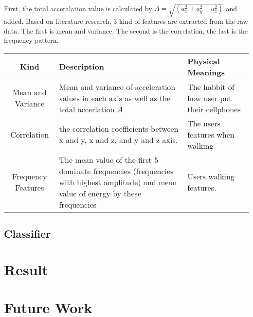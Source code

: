 \documentclass{article}
\begin{document}
		\paragraph{}First, the total acceralation value is calculated by $A=\sqrt{(a_x^2+a_y^2+a_z^2)}$ and added. Based on literature research, 3 kind of features are extracted from the raw data. The first is mean and variance. The second is the correlation, the last is the frequency pattern. 
		\begin{table}
			\centering
			\begin{tabular}{c|p{5cm}|p{5cm}}
			Kind & Description & Physical Meanings \\ \hline
			Mean and Variance & Mean and variance of acceleration values in each axis as well as the total accerlation $A$ & The habbit of how user put their cellphones \\ \hline
			Correlation & the correlation coefficients between x and y, x and z, and y and z axis. & The users features when walking \\ \hline
			Frequency Features & The mean value of the first 5 dominate frequencies (frequencies with highest amplitude) and mean value of energy by these frequencies & Users walking features.
			\end{tabular}
			
		\end{table}
		
		
		
	
		\subsection{Classifier} %
		\label{sub:classifier}
		
	
	
	\section{Result} %
	\label{sec:result}
	
	
	\section{Future Work} %
	\label{sec:future_work}
	
	
\end{document}
